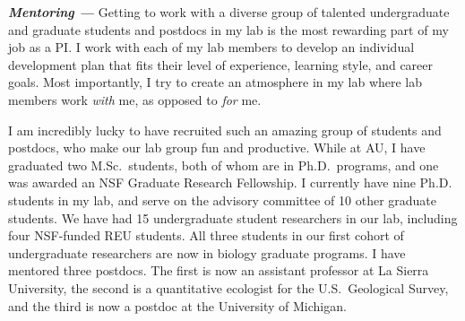\textit{\textbf{Mentoring ---}}
Getting to work with a diverse group of talented undergraduate and graduate
students and postdocs in my lab is the most rewarding part of my job as a
PI.
I work with each of my lab members to develop an individual development
plan that fits
their level of experience, learning style, and career goals.
Most importantly, I try to create an atmosphere in my lab where
lab members work \emph{with} me, as opposed to \emph{for} me.

I am incredibly lucky to have recruited such an amazing group of students and
postdocs, who make
our lab group fun and productive.
While at AU, I have graduated two M.Sc.\ students, both of whom are in Ph.D.\
programs, and one was awarded an NSF Graduate Research Fellowship.
I currently have nine Ph.D. students in my lab, and serve on the advisory
committee of 10 other graduate students.
We have had 15 undergraduate student researchers in our lab, including four
NSF-funded REU students.
All three students in our first cohort of undergraduate researchers are now in
biology graduate programs.
I have mentored three postdocs.
The first is now an assistant professor at La Sierra University, the second is
a quantitative ecologist for the U.S.\ Geological Survey, and the third is
now a postdoc at the University of Michigan.
